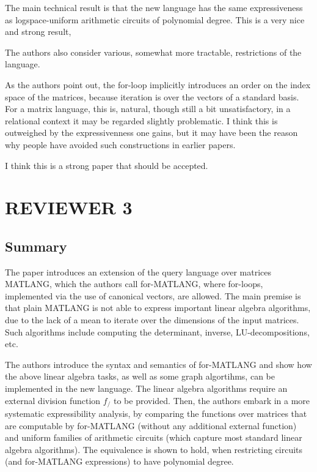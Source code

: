 \documentclass[a4paper]{article}
\begin{document}
The main technical result is that the new language has the same
expressiveness as logspace-uniform arithmetic circuits of polynomial degree.
This is a very nice and strong result,

The authors also consider various, somewhat more tractable,
restrictions of the language.

As the authors point out, the for-loop implicitly introduces an order
on the index space of the matrices, because iteration is over the
vectors of a standard basis. For a matrix language, this is,
natural, though still a bit unsatisfactory, in a relational context
it may be regarded slightly problematic. I think this is outweighed
by the expressivenness one gains, but it may have been the reason why
people have avoided such constructions in earlier papers.

I think this is a strong paper that should be accepted.

\newpage

\section*{REVIEWER 3}

\subsection*{Summary}

The paper introduces an extension of the query language over matrices MATLANG, which the authors call for-MATLANG, where for-loops, 
implemented via the use of canonical vectors, are allowed.
The main premise is that plain MATLANG is not able to express important linear algebra algorithms, 
due to the lack of a mean to iterate over the dimensions of the input matrices.
Such algorithms include computing the determinant, inverse, LU-decompositions, etc.

The authors introduce the syntax and semantics of for-MATLANG and show how the above linear algebra tasks, 
as well as some graph algortihms, can be implemented in the new language.
The linear algebra algorithms require an external division function $f_/$ to be provided.
Then, the authors embark in a more systematic expressibility analysis, by comparing the functions over matrices that are 
computable by for-MATLANG (without any additional external function) and uniform families of arithmetic circuits (which 
capture most standard linear algebra algorithms).
The equivalence is shown to hold, when restricting circuits (and for-MATLANG expressions) to have polynomial degree.
\end{document}
